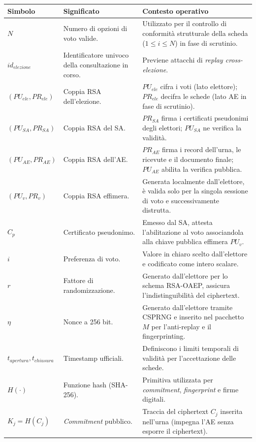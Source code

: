 \begin{table}[H]
\centering
\renewcommand{\arraystretch}{1.3} %
\begin{tabular}{|l|p{4.5cm}|p{7.5cm}|}
\hline
\textbf{Simbolo} & \textbf{Significato} & \textbf{Contesto operativo} \\ \hline
$N$ & Numero di opzioni di voto valide. & Utilizzato per il controllo di conformità strutturale della scheda ($1 \le i \le N$) in fase di scrutinio. \\ \hline
$id_{elezione}$ & Identificatore univoco della consultazione in corso. & Previene attacchi di \textit{replay cross-elezione}. \\ \hline
$(PU_{ele}, PR_{ele})$ & Coppia RSA dell'elezione. & $PU_{ele}$ cifra i voti (lato elettore); $PR_{ele}$ decifra le schede (lato AE in fase di scrutinio). \\ \hline
$(PU_{SA}, PR_{SA})$ & Coppia RSA del SA. & $PR_{SA}$ firma i certificati pseudonimi degli elettori; $PU_{SA}$ ne verifica la validità. \\ \hline
$(PU_{AE}, PR_{AE})$ & Coppia RSA dell'AE. & $PR_{AE}$ firma i record dell'urna, le ricevute e il documento finale; $PU_{AE}$ abilita la verifica pubblica. \\ \hline
$(PU_v, PR_v)$ & Coppia RSA effimera. & Generata localmente dall'elettore, è valida solo per la singola sessione di voto e successivamente distrutta. \\ \hline
$C_p$ & Certificato pseudonimo. & Emesso dal SA, attesta l'abilitazione al voto associandola alla chiave pubblica effimera $PU_v$. \\ \hline
$i$ & Preferenza di voto. & Valore in chiaro scelto dall'elettore e codificato come intero scalare. \\ \hline
$r$ & Fattore di randomizzazione. & Generato dall'elettore per lo schema RSA-OAEP, assicura l'indistinguibilità del ciphertext. \\ \hline
$\eta$ & Nonce a 256 bit. & Generato dall'elettore tramite CSPRNG e inserito nel pacchetto $M$ per l'anti-replay e il fingerprinting. \\ \hline
$t_{apertura}, t_{chiusura}$ & Timestamp ufficiali. & Definiscono i limiti temporali di validità per l'accettazione delle schede. \\ \hline
$H(\cdot)$ & Funzione hash (SHA-256). & Primitiva utilizzata per \textit{commitment}, \textit{fingerprint} e firme digitali. \\ \hline
$K_j = H(C_j)$ & \textit{Commitment} pubblico. & Traccia del ciphertext $C_j$ inserita nell'urna (impegna l'AE senza esporre il ciphertext). \\ \hline

\end{tabular}
\end{table}
